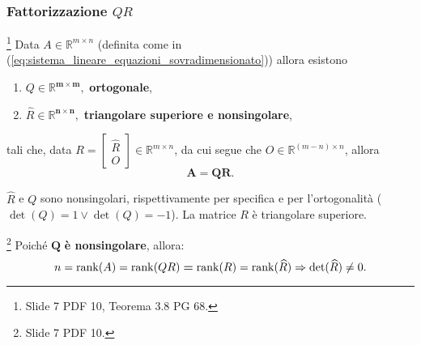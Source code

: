 \subsubsection{Fattorizzazione \texorpdfstring{$QR$}{QR}}
\begin{theorem}\label{th:esistenza_fattorizzazione_QR}\footnote{Slide 7 PDF 10, Teorema 3.8 PG 68.}
    Data $A\in\mathbb R^{m\times n}$ (definita come in (\ref{eq:sistema_lineare_equazioni_sovradimensionato})) allora esistono
    \begin{enumerate}
        \item $Q\in\mathbb R^{\boldsymbol{m\times m}},$ \textbf{ortogonale},
        \item $\widehat R\in\mathbb R^{\boldsymbol{n\times n}},$ \textbf{triangolare superiore e \gls{nonsingolare}},
    \end{enumerate}
    tali che, data $R =
    \begin{bmatrix}
        \widehat R\\
        O
    \end{bmatrix}\in \mathbb R^{m\times n}$, da cui segue che $O\in\mathbb R^{(m-n)\times n}$, allora
    \begin{equation}\label{eq:fattorizzazione_QR}
        \boldsymbol{A=QR.}
    \end{equation}
\end{theorem}

$\widehat R$ e $Q$ sono nonsingolari, rispettivamente per specifica e per l'ortogonalità ($\det(Q)=1\vee \det(Q)=-1$). La matrice $R$ è triangolare superiore.

\begin{remark}\label{rem:fattQRNonSing}\footnote{Slide 7 PDF 10.}
    Poiché $\boldsymbol Q$ \textbf{è \gls{nonsingolare}}, allora:
    \begin{equation*}
        n = \operatorname{rank}(A) = \operatorname{rank} (QR) \boldsymbol = \operatorname{rank}(R) = \operatorname{rank}(\widehat R)\Rightarrow \det(\widehat R)\neq 0.
    \end{equation*}
\end{remark}

